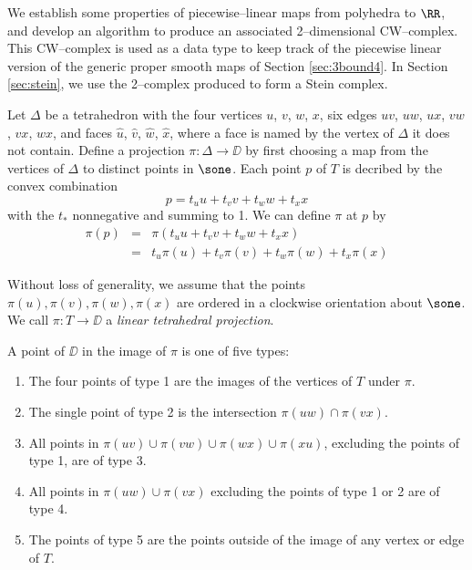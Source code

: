 We establish some properties of piecewise--linear maps from polyhedra to $\RR$, and develop an algorithm to produce an associated 2--dimensional CW--complex.
This CW--complex is used as a data type to keep track of the piecewise linear version of the generic proper smooth maps of Section \ref{sec:3bound4}.
In Section \ref{sec:stein}, we use the 2--complex produced to form a Stein complex.

\begin{defn}
	\label{def:stdproj}
	Let $\Delta$ be a tetrahedron with the four vertices $u$, $v$, $w$, $x$, six edges $uv$, $uw$, $ux$, $vw$, $vx$, $wx$, and faces $\hat{u}$, $\hat{v}$, $\hat{w}$, $\hat{x}$, where a face is named by the vertex of $\Delta$ it does not contain.
	Define a projection $\pi: \Delta \to\DD$ by first choosing a map from the vertices of $\Delta$ to distinct points in $\sone$.
	Each point $p$ of $T$ is decribed by the convex combination
	\[
		p = t_u u + t_v v + t_w w + t_x x
	\]
	with the $t_*$ nonnegative and summing to 1.
	We can define $\pi$ at $p$ by
	\begin{eqnarray}
		\label{affine_extension}
		\pi(p)
		&=&
		\pi(t_u u + t_v v + t_w w + t_x x) \nonumber \\
		&=&
		t_u \pi(u) + t_v \pi(v) + t_w \pi(w) + t_x \pi(x)
	\end{eqnarray}
	  
	Without loss of generality, we assume that the points $\pi(u),\pi(v),\pi(w),\pi(x)$ are ordered in a clockwise orientation about $\sone$.
	We call $\pi:T\to\DD$ a \emph{linear tetrahedral projection}.
\end{defn}

\begin{defn}
	\label{def:projpttypes}
	A point of $\DD$ in the image of $\pi$ is one of five types:
	\begin{enumerate}
		\item The four points of type 1 are the images of the vertices of $T$ under $\pi$.
		\item The single point of type 2 is the intersection $\pi(uw)\cap\pi(vx)$.
		\item All points in $\pi(uv)\cup\pi(vw)\cup\pi(wx)\cup\pi(xu)$, excluding the points of type 1, are of type 3.
		\item All points in $\pi(uw)\cup\pi(vx)$ excluding the points of type 1 or 2 are of type 4.
		\item The points of type 5 are the points outside of the image of any vertex or edge of $T$.
	\end{enumerate}
\end{defn}

